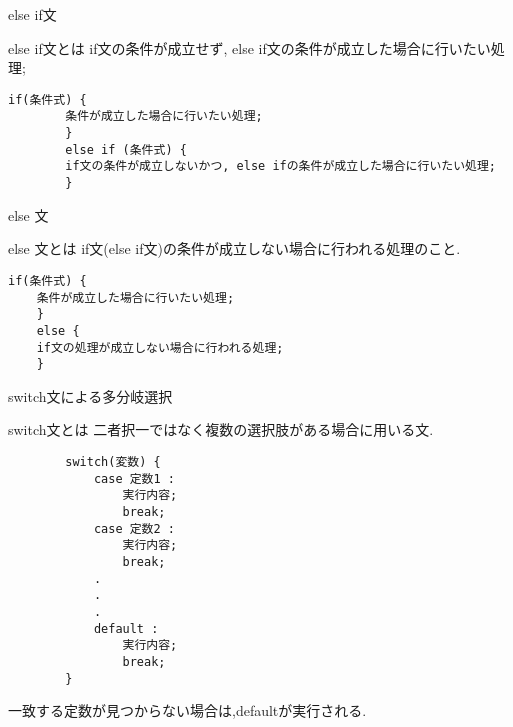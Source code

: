 \documentclass[xdvipdfmx, 8pt, t]{beamer}
\begin{document}
\begin{frame}[fragile]{else if文} 
    \begin{block}{else if文とは}
        if文の条件が成立せず, else if文の条件が成立した場合に行いたい処理;
    \end{block}
    \begin{lstlisting}[caption=else if文の一般形]
        if(条件式) {
        条件が成立した場合に行いたい処理;
        }
        else if (条件式) {
        if文の条件が成立しないかつ, else ifの条件が成立した場合に行いたい処理;
        }
    \end{lstlisting}
\end{frame}

\begin{frame}[fragile]{else 文}
\begin{block}{else 文とは}
   if文(else if文)の条件が成立しない場合に行われる処理のこと.
\end{block}
\begin{lstlisting}[caption=else 文の一般形]
    if(条件式) {
    条件が成立した場合に行いたい処理;
    }
    else {
    if文の処理が成立しない場合に行われる処理;
    }
\end{lstlisting}
\end{frame}

\begin{frame}[fragile]{switch文による多分岐選択}
    \begin{block}{switch文とは}
        二者択一ではなく複数の選択肢がある場合に用いる文.
    \end{block}
    \tiny
    \begin{lstlisting}
        switch(変数) {
            case 定数1 : 
                実行内容;
                break;
            case 定数2 :
                実行内容;
                break;
            .
            .
            .
            default : 
                実行内容;
                break;
        }
    \end{lstlisting}
    \normalsize	
    一致する定数が見つからない場合は,defaultが実行される.
\end{frame}
\end{document}

